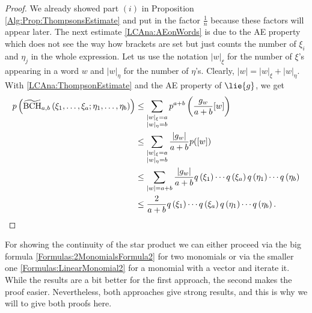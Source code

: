 \begin{proof}
	We already showed part $(i)$ in Proposition 
	\ref{Alg:Prop:ThompsonsEstimate} and put in the factor $\frac{1}{n}$ 
	because these factors will appear later. The next estimate 
	\eqref{LCAna:AEonWords} is due to the AE property which does not see the 
	way how brackets are set but just counts the number of $\xi_i$ and 
	$\eta_j$ in the whole expression.
	Let us use the notation $|w|_{\xi}$ for the number of $\xi$'s appearing
	in a word $w$ and $|w|_{\eta}$ for the number of $\eta$'s. Clearly, $|w| =
	|w|_{\xi} + |w|_{\eta}$. With \eqref{LCAna:ThompsonEstimate} and the AE
	property of $\lie{g}$, we get
	\begin{align*}
		p \left(
			\widetilde{\mathrm{BCH}}_{a, b}\left(\xi_1, \ldots, \xi_a; \eta_1, \ldots, \eta_b\right)
		\right)
		& \leq
		\sum\limits_{\substack{
			|w|_{\xi} = a \\
			|w|_{\eta} = b
		}}
		p^{a + b} \left(
			\frac{g_w}{a + b}
			[w]
		\right)
		\\
		& \leq
		\sum\limits_{\substack{
			|w|_{\xi} = a \\
			|w|_{\eta} = b
		}}
		\frac{ |g_w| }{a + b}
		p([w])
		\\
		& \leq
		\sum\limits_{ |w| = a + b }
		\frac{ |g_w| }{a + b}
		q\left( \xi_1 \right) \cdots q\left( \xi_a \right)
		q\left( \eta_1 \right) \cdots q\left( \eta_b \right)
		\\
		& \leq
		\frac{2}{a + b}
		q\left( \xi_1 \right) \cdots q\left( \xi_a \right)
		q\left( \eta_1 \right) \cdots q\left( \eta_b \right).
	\end{align*}
\end{proof}
For showing the continuity of the star product we can either proceed via the 
big formula \eqref{Formulas:2MonomialsFormula2} for two monomials or via the 
smaller one \eqref{Formulas:LinearMonomial2} for a monomial with a vector and 
iterate it. While the results are a bit better for the first approach, the 
second makes the proof easier. Nevertheless, both approaches give strong 
results, and this is why we will to give both proofs here.



